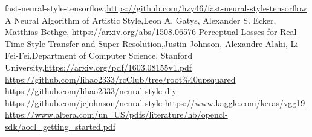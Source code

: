 \begin{thebibliography}{9}

  fast-neural-style-tensorflow,\url{https://github.com/hzy46/fast-neural-style-tensorflow}
  A Neural Algorithm of Artistic Style,Leon A. Gatys, Alexander S. Ecker, Matthias Bethge, \url{https://arxiv.org/abs/1508.06576}
  Perceptual Losses for Real-Time Style Transfer and Super-Resolution,Justin Johnson, Alexandre Alahi, Li Fei-Fei,Department of Computer Science, Stanford University,\url{https://arxiv.org/pdf/1603.08155v1.pdf}
\url{https://github.com/lihao2333/rcClub/tree/root\%40upsquared}
\url{https://github.com/lihao2333/neural-style-diy}
\url{https://github.com/jcjohnson/neural-style}
\url{https://www.kaggle.com/keras/vgg19}
\url{https://www.altera.com/un\_US/pdfs/literature/hb/opencl-sdk/aocl\_getting\_started.pdf}
\end{thebibliography}
 
\clearpage
